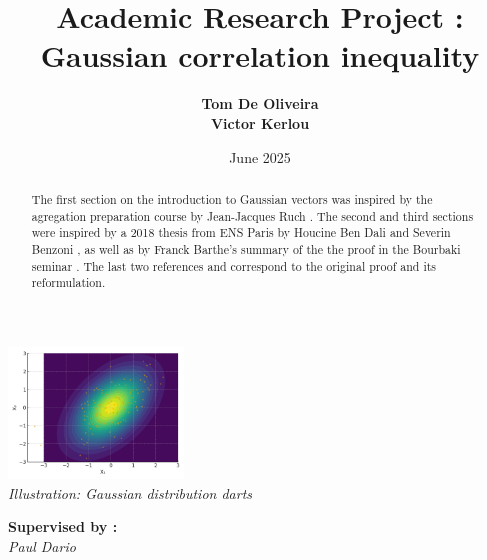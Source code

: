 \documentclass[12pt]{article}
\title{\huge\textbf{Academic Research Project :  Gaussian correlation inequality}}
\author{
    \textbf{Tom De Oliveira}\\
    \textbf{Victor Kerlou}
}
\date{June 2025}
\begin{document}
\maketitle 



\vspace{1cm} %

\begin{center}
    \includegraphics[width=0.35\textwidth]{photo.png} \\[1em]
    \textit{Illustration: Gaussian distribution darts}
\end{center}

\vspace{2cm} %

\begin{flushright}
    \textbf{Supervised by :} \\
    \textit{Paul Dario}
\end{flushright}

\vspace{1cm} %


\newpage %

\begin{abstract}
The first section on the introduction to Gaussian vectors was inspired by the agregation preparation course by Jean-Jacques Ruch \cite{ruch}.
The second and third sections were inspired by a 2018 thesis from ENS Paris by Houcine Ben Dali and Severin Benzoni \cite{benzoni}, as well as by Franck Barthe's summary of the the proof in the Bourbaki seminar \cite{barthe}. The last two references \cite{Royen} and \cite{Matlak} correspond to the original proof and its reformulation.



\end{abstract} 


\newpage
\renewcommand{\tableofcontentsname}{Summuary}
\tableofcontents %
\end{document}
